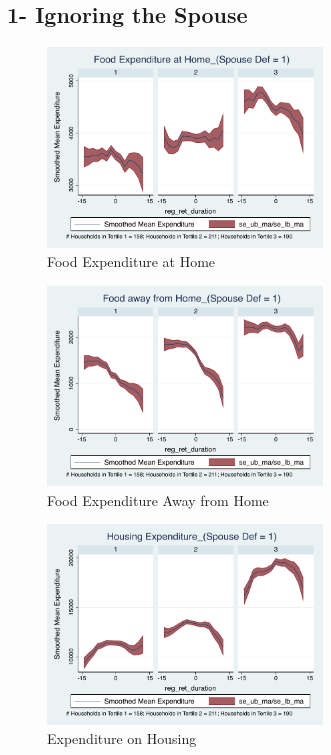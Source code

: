 \documentclass[11pt,onecolumn]{article}
\numberwithin{figure}{section}
\begin{document}
\subsection{1- Ignoring the Spouse}

\begin{figure}[h]
	\caption{Food Expenditure at Home}
	\centering
	\includegraphics[width=0.65\textwidth]{../ConsumptionPostRetirement_by_SpouseDef_Cats/Smoothed/1/spouse_def_total_foodexp_home_real.pdf}
\end{figure}


\begin{figure}[h]
	\caption{Food Expenditure Away from Home}
	\centering
	\includegraphics[width=0.65\textwidth]{../ConsumptionPostRetirement_by_SpouseDef_Cats/Smoothed/1/spouse_def_total_foodexp_away_real.pdf}
\end{figure}

\clearpage

\begin{figure}[h]
	\caption{Expenditure on Housing}
	\centering
	\includegraphics[width=0.65\textwidth]{../ConsumptionPostRetirement_by_SpouseDef_Cats/Smoothed/1/spouse_def_total_housing_real.pdf}
\end{figure}
\end{document}
